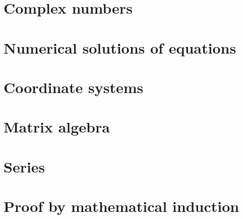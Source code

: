 \documentclass[a4paper]{article}
\begin{document}
\maketitle




\tableofcontents

\section{Complex numbers}

\section{Numerical solutions of equations}

\section{Coordinate systems}

\section{Matrix algebra}

\section{Series}

\section{Proof by mathematical induction}
\end{document}
